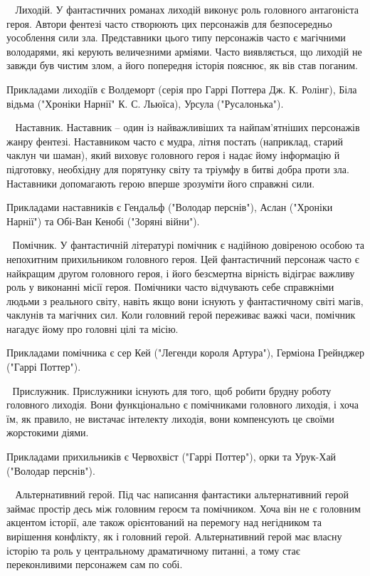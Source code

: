 🧛‍♂️ Лиходій. 
У фантастичних романах лиходій виконує роль головного антагоніста героя. Автори фентезі часто створюють цих персонажів для безпосередньо уособлення сили зла. Представники цього типу персонажів часто є магічними володарями, які керують величезними арміями. Часто виявляється, що лиходій не завжди був чистим злом, а його попередня історія пояснює, як вів став поганим. 

Прикладами лиходіїв є Волдеморт (серія про Гаррі Поттера Дж. К. Ролінг), Біла відьма ("Хроніки Нарнії" К. С. Льюїса), Урсула ("Русалонька").

🧙‍♂️ Наставник. 
Наставник – один із найважливіших та найпам’ятніших персонажів жанру фентезі. Наставником часто є мудра, літня постать (наприклад, старий чаклун чи шаман), який виховує головного героя і надає йому інформацію й підготовку, необхідну для порятунку світу та тріумфу в битві добра проти зла. Наставники допомагають герою вперше зрозуміти його справжні сили. 

Прикладами наставників є Гендальф ("Володар перснів"), Аслан ("Хроніки Нарнії") та Обі-Ван Кенобі ("Зоряні війни").

🤝 Помічник. 
У фантастичній літературі помічник є надійною довіреною особою та непохитним прихильником головного героя. Цей фантастичний персонаж часто є найкращим другом головного героя, і його безсмертна вірність відіграє важливу роль у виконанні місії героя. Помічники часто відчувають себе справжніми людьми з реального світу, навіть якщо вони існують у фантастичному світі магів, чаклунів та магічних сил. Коли головний герой переживає важкі часи, помічник нагадує йому про головні цілі та місію. 

Прикладами помічника є сер Кей ("Легенди короля Артура"), Герміона Грейнджер ("Гаррі Поттер").

👤 Прислужник.
Прислужники існують для того, щоб робити брудну роботу головного лиходія. Вони функціонально є помічниками головного лиходія, і хоча їм, як правило, не вистачає інтелекту лиходія, вони компенсують це своїми жорстокими діями.

Прикладами прихильників є Червохвіст ("Гаррі Поттер"), орки та Урук-Хай ("Володар перснів").

🧝‍♀️ Альтернативний герой. 
Під час написання фантастики альтернативний герой займає простір десь між головним героєм та помічником. Хоча він не є головним акцентом історії, але також орієнтований на перемогу над негідником та вирішення конфлікту, як і головний герой. Альтернативний герой має власну історію та роль у центральному драматичному питанні, а тому стає переконливими персонажем сам по собі. 

